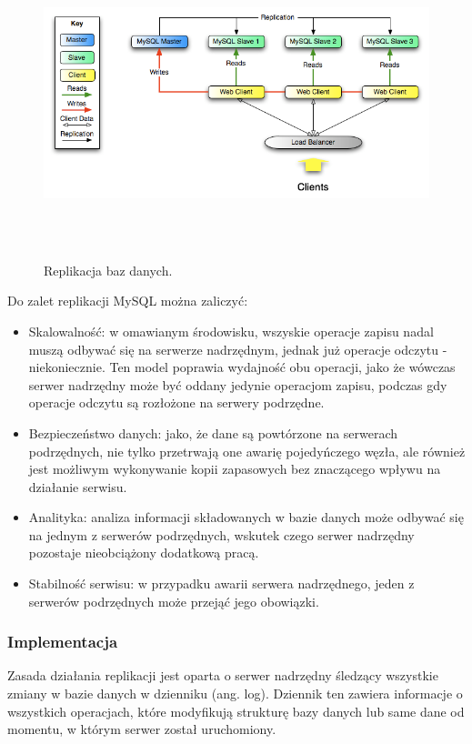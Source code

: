 \documentclass[11pt,a4paper,twoside]{article}
\begin{document}
\begin{figure}[ht]
\caption{Replikacja baz danych.}
\label{replikacja}
\centering
\includegraphics[height=9cm, width=15.7cm]{replikacja}
\end{figure}

Do zalet replikacji MySQL można zaliczyć:
\begin{itemize}
\item Skalowalność: w omawianym środowisku, wszyskie operacje zapisu nadal muszą odbywać się na serwerze nadrzędnym, jednak już operacje odczytu - niekoniecznie. Ten model poprawia wydajność obu operacji, jako że wówczas serwer nadrzędny może być oddany jedynie operacjom zapisu, podczas gdy operacje odczytu są rozłożone na serwery podrzędne.
\item Bezpieczeństwo danych: jako, że dane są powtórzone na serwerach podrzędnych, nie tylko przetrwają one awarię pojedyńczego węzła, ale również jest możliwym wykonywanie kopii zapasowych bez znaczącego wpływu na działanie serwisu.
\item Analityka: analiza informacji składowanych w bazie danych może odbywać się na jednym z serwerów podrzędnych, wskutek czego serwer nadrzędny pozostaje nieobciążony dodatkową pracą.
\item Stabilność serwisu: w przypadku awarii serwera nadrzędnego, jeden z serwerów podrzędnych może przejąć jego obowiązki.
\end{itemize}

\subsubsection{Implementacja}
Zasada działania replikacji jest oparta o serwer nadrzędny śledzący wszystkie zmiany w bazie danych w dzienniku (ang. log). Dziennik ten zawiera informacje o wszystkich operacjach, które modyfikują strukturę bazy danych lub same dane od momentu, w którym serwer został uruchomiony.
\end{document}
